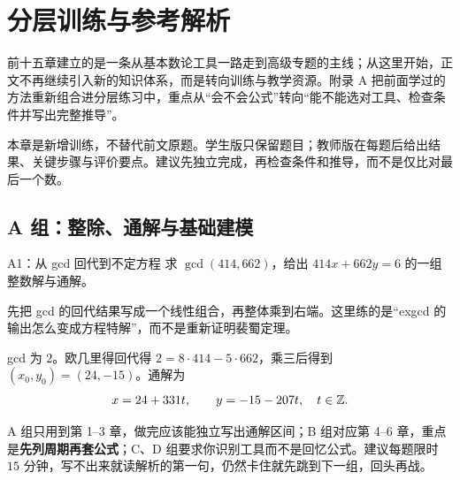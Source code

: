 

\chapter{分层训练与参考解析}
\begin{chapterintro}[章节导读]
前十五章建立的是一条从基本数论工具一路走到高级专题的主线；从这里开始，正文不再继续引入新的知识体系，而是转向训练与教学资源。附录 A 把前面学过的方法重新组合进分层练习中，重点从“会不会公式”转向“能不能选对工具、检查条件并写出完整推导”。
\end{chapterintro}

本章是新增训练，不替代前文原题。学生版只保留题目；教师版在每题后给出结果、关键步骤与评价要点。建议先独立完成，再检查条件和推导，而不是仅比对最后一个数。

\section{A 组：整除、通解与基础建模}
\begin{problem}{A1：从 gcd 回代到不定方程}
求 $\gcd(414,662)$，给出 $414x+662y=6$ 的一组整数解与通解。
\end{problem}

\begin{pitfall}[讲解：先看这题到底在做什么]
先把 gcd 的回代结果写成一个线性组合，再整体乘到右端。这里练的是“exgcd 的输出怎么变成方程特解”，而不是重新证明裴蜀定理。
\end{pitfall}

\sol gcd 为 $2$。欧几里得回代得 $2=8\cdot414-5\cdot662$，乘三后得到 $(x_0,y_0)=(24,-15)$。通解为
\[
 x=24+331t,\qquad y=-15-207t,\quad t\in\mathbb Z.
\]

\begin{tip}[三档练习的用法]
A 组只用到第 1--3 章，做完应该能独立写出通解区间；B 组对应第 4--6 章，重点是\textbf{先列周期再套公式}；C、D 组要求你识别工具而不是回忆公式。建议每题限时 $15$ 分钟，写不出来就读解析的第一句，仍然卡住就先跳到下一组，回头再战。
\end{tip}

